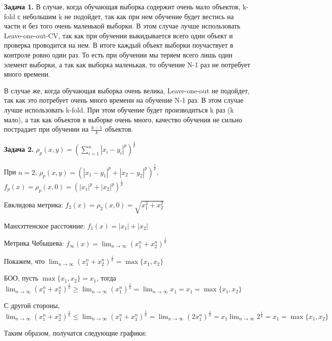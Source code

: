 \documentclass{article}
\begin{document}
    \textbf {Задача 1.}
    В случае, когда обучающая выборка содержит очень мало объектов, k-fold с небольшим k не подойдет, так как при нем обучение будет вестись на части и без того очень маленькой выборки.
    В этом случае лучше использовать Leave-one-out-CV, так как при обучении выкидывается всего один объект и проверка проводится на нем.
    В итоге каждый объект выборки поучаствует в контроле ровно один раз.
    То есть при обучении мы теряем всего лишь один элемент выборки, а так как выборка маленькая, то обучение N-1 раз не потребует много времени.

    В случае же, когда обучающая выборка очень велика, Leave-one-out не подойдет, так как это потребует очень много времени на обучение N-1 раз.
    В этом случае лучше использовать k-fold.
    При этом обучение будет производиться k раз (k мало), а так как объектов в выборке очень много, качество обучения не сильно пострадает при обучении на $\frac{k-1}{k}$ объектов.

    \textbf {Задача 2.}
    $\rho_p(x,y)=(\sum_{i=1}^n|x_i-y_i|^p)^{\frac{1}{p}}$

    При $n=2$, $\rho_p(x,y)=(|x_1-y_1|^p+|x_2-y_2|^p)^{\frac{1}{p}}$, $f_p(x)=\rho_p(x,0)=(|x_1|^p+|x_2|^p)^{\frac{1}{p}}$

    Евклидова метрика: $f_2(x)=\rho_2(x,0)=\sqrt{x_1^2+x_2^2}$

    Манхэттенское расстояние: $f_1(x)=|x_1|+|x_2|$

    Метрика Чебышева: $f_\infty(x)=\lim_{n\to\infty}(x_1^n+x_2^n)^{\frac{1}{n}}$

    Покажем, что $\lim_{n\to\infty}(x_1^n+x_2^n)^{\frac{1}{n}}=\max\{x_1,x_2\}$

    БОО, пусть $\max\{x_1,x_2\}=x_1$, тогда
    $\lim_{n\to\infty}(x_1^n+x_2^n)^{\frac{1}{n}}\geq\lim_{n\to\infty}(x_1^n)^{\frac{1}{n}}=\lim_{n\to\infty}x_1=x_1=\max\{x_1,x_2\}$

    С другой стороны, $\lim_{n\to\infty}(x_1^n+x_2^n)^{\frac{1}{n}}\leq\lim_{n\to\infty}(x_1^n+x_1^n)^{\frac{1}{n}}=\lim_{n\to\infty}(2x_1^n)^{\frac{1}{n}}=x_1\lim_{n\to\infty}2^{\frac{1}{n}}=x_1=\max\{x_1,x_2\}$

    Таким образом, получатся следующие графики:
\end{document}
